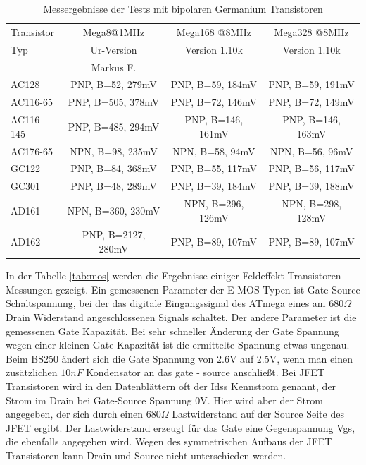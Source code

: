 \begin{table}[H]
  \begin{center}
    \begin{tabular}{| l | c | c | c |}
    \hline
 Transistor & Mega8@1MHz          & Mega168 @8MHz       & Mega328 @8MHz    \\
    Typ     & Ur-Version          & Version 1.10k       & Version 1.10k  \\
            & Markus F.           &                     &        \\
    \hline
    \hline
AC128       & PNP, B=52, 279mV    & PNP, B=59, 184mV    & PNP, B=59, 191mV    \\
    \hline
AC116-65    & PNP, B=505, 378mV   & PNP, B=72, 146mV    & PNP, B=72, 149mV    \\
    \hline
AC116-145   & PNP, B=485, 294mV   & PNP, B=146, 161mV    & PNP, B=146, 163mV   \\
    \hline
AC176-65    & NPN, B=98, 235mV    & NPN, B=58, 94mV    & NPN, B=56, 96mV     \\
    \hline
GC122       & PNP, B=84, 368mV    & PNP, B=55, 117mV    & PNP, B=56, 117mV    \\
    \hline
GC301       & PNP, B=48, 289mV    & PNP, B=39, 184mV    & PNP, B=39, 188mV    \\
    \hline
AD161       & NPN, B=360, 230mV   & NPN, B=296, 126mV   & NPN, B=298, 128mV    \\
    \hline
AD162       & PNP, B=2127, 280mV  & PNP, B=89, 107mV    & PNP, B=89, 107mV    \\
    \hline
    \end{tabular}
  \end{center}
  \caption{Messergebnisse der Tests mit bipolaren Germanium Transistoren}
  \label{tab:germanium} 
\end{table}

In der Tabelle \ref{tab:mos} werden die Ergebnisse einiger Feldeffekt-Transistoren Messungen gezeigt.
Ein gemessenen Parameter der E-MOS Typen ist Gate-Source Schaltspannung,
bei der das digitale Eingangssignal des ATmega eines am \(680\Omega\) Drain Widerstand 
angeschlossenen Signals schaltet.
Der andere Parameter ist die gemessenen Gate Kapazität.
Bei sehr schneller Änderung der Gate Spannung wegen einer kleinen Gate Kapazität 
ist die ermittelte Spannung etwas ungenau.
Beim BS250 ändert sich die Gate Spannung von 2.6V auf 2.5V, wenn man einen zusätzlichen
\(10nF\) Kondensator an das gate - source anschließt.
Bei JFET Transistoren wird in den Datenblättern oft der Idss Kennstrom genannt,
der Strom im Drain bei Gate-Source Spannung 0V.
Hier wird aber der Strom angegeben, der sich durch einen \(680\Omega\) Lastwiderstand auf der
Source Seite des JFET ergibt.
Der Lastwiderstand erzeugt für das Gate eine Gegenspannung Vgs,
die ebenfalls angegeben wird.
Wegen des symmetrischen Aufbaus der JFET Transistoren kann Drain und Source nicht unterschieden werden.

